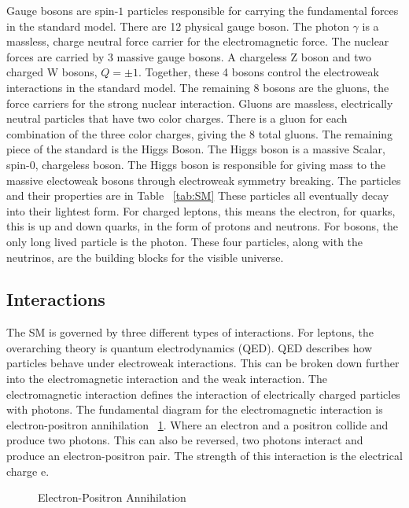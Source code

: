 \indent Gauge bosons are spin-${1}$ particles responsible for carrying the fundamental forces in the standard model. There are 12 physical gauge boson. The photon ${\gamma}$ is a massless, charge neutral force carrier for the electromagnetic force. The nuclear forces are carried by 3 massive gauge bosons. A chargeless Z boson and two charged W bosons, ${Q = \pm 1}$. Together, these 4 bosons control the electroweak interactions in the standard model. The remaining 8 bosons are the gluons, the force carriers for the strong nuclear interaction. Gluons are massless, electrically neutral particles that have two color charges. There is a gluon for each combination of the three color charges, giving the 8 total gluons. \linebreak
\indent The remaining piece of the standard is the Higgs Boson. The Higgs boson is a massive Scalar, spin-${0}$, chargeless boson. The Higgs boson is responsible for giving mass to the massive electoweak bosons through electroweak symmetry breaking. The particles and their properties are in Table ~\ref{tab:SM}\linebreak
\indent These particles all eventually decay into their lightest form. For charged leptons, this means the electron, for quarks, this is up and down quarks, in the form of protons and neutrons. For bosons, the only long lived particle is the photon. These four particles, along with the neutrinos, are the building blocks for the visible universe.
\subsection{Interactions}
The SM is governed by three different types of interactions. For leptons, the overarching theory is quantum electrodynamics (QED). QED describes how particles behave under electroweak interactions. This can be broken down further into the electromagnetic interaction and the weak interaction. The electromagnetic interaction defines the interaction of electrically charged particles with photons. The fundamental diagram for the electromagnetic interaction is electron-positron annihilation ~\ref{Fey:e-p}. Where an electron and a positron collide and produce two photons. This can also be reversed, two photons interact and produce an electron-positron pair. The strength of this interaction is the electrical charge e. \linebreak

\begin{figure}[h]

\begin{center}
\caption{Electron-Positron Annihilation}
\label{Fey:e-p}
\end{center}
\end{figure}

